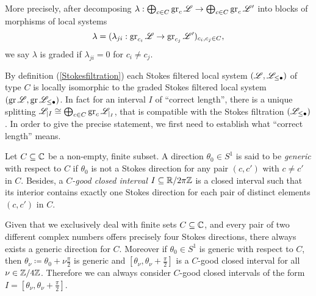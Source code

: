 \begin{rem}
    More precisely, after decomposing $\lambda:\bigoplus_{c\in C}\operatorname{gr}_c\mathscr{L} \to \bigoplus_{c \in C}\operatorname{gr}_c\mathscr{L}'$ into blocks of morphisms of local systems \[\lambda = (\lambda_{ji}: \operatorname{gr}_{c_i}\mathscr{L} \to \operatorname{gr}_{c_j}\mathscr{L}')_{c_i,c_j \in C},\] we say $\lambda$ is graded if $\lambda_{ji} = 0$ for $c_i \neq c_j$.
\end{rem}



By definition (\ref{Stokesfiltration}) each Stokes filtered local system $(\mathscr{L}, \mathscr{L}_{\leq \bullet})$ of type $C$ is locally isomorphic to the graded Stokes filtered local system $(\operatorname{gr}\mathscr{L}, \operatorname{gr}\mathscr{L}_{\leq \bullet})$. In fact for an interval $I$ of ``correct length'', there is a unique splitting $\mathscr{L}_{\vert I} \cong \bigoplus_{c \in C}\operatorname{gr}_c\mathscr{L}_{\vert_I}$, that is compatible with the Stokes filtration $(\mathscr{L}_{\leq \bullet})$. In order to give the precise statement, we first need to establish what ``correct length'' means.

\begin{defi}\label{genericdirection}
Let $C \subseteq \mathbb{C}$ be a non-empty, finite subset. 
A direction $\theta_0 \in S^1$ is said to be \emph{generic} with respect to $C$ if $\theta_0$ is not a Stokes direction for any pair $(c,c')$ with $c\neq c'$ in $C$.
Besides, a \emph{$C$-good closed interval} $I \subseteq \mathbb{R}/2\pi\mathbb{Z}$ is a closed interval such that its interior contains exactly one Stokes direction for each pair of distinct elements $(c,c')$ in $C$.
\end{defi}

\begin{rem}
    Given that we exclusively deal with finite sets $C \subseteq \mathbb{C}$, and every pair of two different complex numbers offers precisely four Stokes directions, there always exists a generic direction for $C$. Moreover if $\theta_0 \in S^1$ is generic with respect to $C$, then $\theta_\nu \coloneqq \theta_0 + \nu\frac{\pi}{2}$ is generic and $[\theta_\nu, \theta_\nu + \frac{\pi}{2}]$ is a $C$-good closed interval for all $\nu\in \mathbb{Z}/4\mathbb{Z}$. Therefore we can always consider $C$-good closed intervals of the form $I = [\theta_\nu, \theta_\nu + \frac{\pi}{2}]$.
\end{rem}

